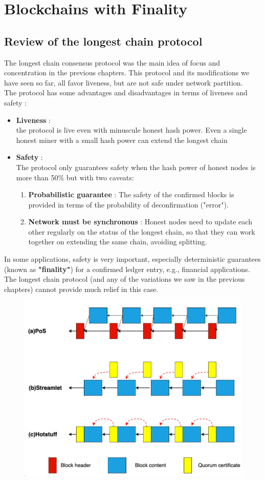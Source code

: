 \chapter{Blockchains with Finality}
\section{Review of the longest chain protocol}
The longest chain consensus protocol was the main idea of focus and concentration in the previous chapters. This protocol and its modifications we have seen so far, all favor liveness, but are not safe under network partition.\\
The protocol has some advantages and disadvantages in terms of liveness and safety :
\begin{itemize}
	\item \textbf{Liveness} : \\
	the protocol is live even with minuscule honest hash power. Even a single honest miner with a small hash power can extend the longest chain
	\item \textbf{Safety} : \\
	The protocol only guarantees safety when the hash power of honest nodes is more than 50\% but with two caveats:
	\begin{enumerate}
		\item \textbf{Probabilistic guarantee} :
		The safety of the confirmed blocks is provided in terms of the probability of deconfirmation ("error").
		\item \textbf{Network must be synchronous} :
		Honest nodes need to update each other regularly on the status of the longest chain, so that they can work together on extending the same chain, avoiding splitting.
	\end{enumerate}
\end{itemize}
In some applications, safety is very important, especially deterministic guarantees (known as \textbf{"finality"}) for a confirmed ledger entry, e.g., financial applications. The longest chain protocol (and any of the variations we saw in the previous chapters) cannot provide much relief in this case.
\begin{figure}[h!]
	\centering
	\includegraphics[width=0.5\linewidth]{Fig/15/F8}
	\caption{}
	\label{fig:L15_f8}
\end{figure}


